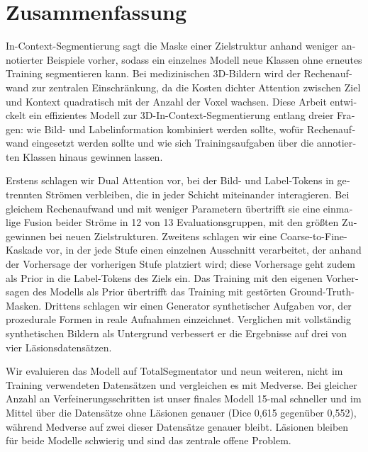 \section*{Zusammenfassung}
\begin{otherlanguage}{ngerman}
In-Context-Segmentierung sagt die Maske einer Zielstruktur anhand weniger
annotierter Beispiele vorher, sodass ein einzelnes Modell neue Klassen ohne
erneutes Training segmentieren kann. Bei medizinischen 3D-Bildern wird der
Rechenaufwand zur zentralen Einschränkung, da die Kosten dichter Attention
zwischen Ziel und Kontext quadratisch mit der Anzahl der Voxel wachsen. Diese
Arbeit entwickelt ein effizientes Modell zur 3D-In-Context-Segmentierung
entlang dreier Fragen: wie Bild- und Labelinformation kombiniert werden
sollte, wofür Rechenaufwand eingesetzt werden sollte und wie sich
Trainingsaufgaben über die annotierten Klassen hinaus gewinnen lassen.

Erstens schlagen wir Dual Attention vor, bei der Bild- und Label-Tokens in
getrennten Strömen verbleiben, die in jeder Schicht miteinander interagieren.
Bei gleichem Rechenaufwand und mit weniger Parametern übertrifft sie eine
einmalige Fusion beider Ströme in 12 von 13 Evaluationsgruppen, mit den
größten Zugewinnen bei neuen Zielstrukturen. Zweitens schlagen wir eine
Coarse-to-Fine-Kaskade vor, in der jede Stufe einen einzelnen Ausschnitt
verarbeitet, der anhand der Vorhersage der vorherigen Stufe platziert wird;
diese Vorhersage geht zudem als Prior in die Label-Tokens des Ziels ein. Das
Training mit den eigenen Vorhersagen des Modells als Prior übertrifft das
Training mit gestörten Ground-Truth-Masken. Drittens schlagen wir einen
Generator synthetischer Aufgaben vor, der prozedurale Formen in reale
Aufnahmen einzeichnet. Verglichen mit vollständig synthetischen Bildern als
Untergrund verbessert er die Ergebnisse auf drei von vier Läsionsdatensätzen.

Wir evaluieren das Modell auf TotalSegmentator und neun weiteren, nicht im
Training verwendeten Datensätzen und vergleichen es mit Medverse. Bei gleicher
Anzahl an Verfeinerungsschritten ist unser finales Modell 15-mal schneller und
im Mittel über die Datensätze ohne Läsionen genauer (Dice 0,615 gegenüber
0,552), während Medverse auf zwei dieser Datensätze genauer bleibt. Läsionen
bleiben für beide Modelle schwierig und sind das zentrale offene Problem.
\end{otherlanguage}
